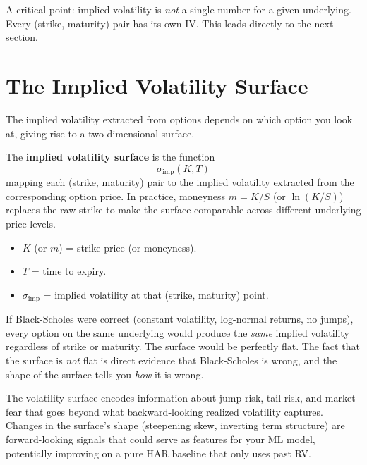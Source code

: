 A critical point: implied volatility is \emph{not} a single number for a given underlying.
Every (strike, maturity) pair has its own IV.
This leads directly to the next section.


\section{The Implied Volatility Surface}
\label{sec:iv-surface}

The implied volatility extracted from options depends on which option you look at, giving rise to a two-dimensional surface.

\begin{definition}
\label{def:iv-surface}
The \textbf{implied volatility surface} is the function
\begin{equation}
  \sigma_{\text{imp}}(K, T)
  \label{eq:iv-surface}
\end{equation}
mapping each (strike, maturity) pair to the implied volatility extracted from the corresponding option price.
In practice, moneyness $m = K/S$ (or $\ln(K/S)$) replaces the raw strike to make the surface comparable across different underlying price levels.
\begin{itemize}[nosep]
  \item $K$ (or $m$) = strike price (or moneyness).
  \item $T$ = time to expiry.
  \item $\sigma_{\text{imp}}$ = implied volatility at that (strike, maturity) point.
\end{itemize}
\end{definition}

\begin{keyidea}
If Black-Scholes were correct (constant volatility, log-normal returns, no jumps), every option on the same underlying would produce the \emph{same} implied volatility regardless of strike or maturity.
The surface would be perfectly flat.
The fact that the surface is \emph{not} flat is direct evidence that Black-Scholes is wrong, and the shape of the surface tells you \emph{how} it is wrong.
\end{keyidea}

\begin{projectconnection}
The volatility surface encodes information about jump risk, tail risk, and market fear that goes beyond what backward-looking realized volatility captures.
Changes in the surface's shape (steepening skew, inverting term structure) are forward-looking signals that could serve as features for your ML model, potentially improving on a pure HAR baseline that only uses past RV.
\end{projectconnection}

